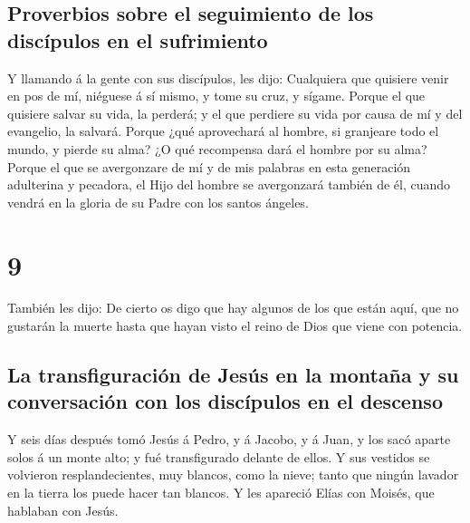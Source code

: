 \hypertarget{proverbios-sobre-el-seguimiento-de-los-discuxedpulos-en-el-sufrimiento}{%
\subsection{Proverbios sobre el seguimiento de los discípulos en el
sufrimiento}\label{proverbios-sobre-el-seguimiento-de-los-discuxedpulos-en-el-sufrimiento}}

 Y llamando á la gente con sus discípulos, les dijo:
Cualquiera que quisiere venir en pos de mí, niéguese á sí mismo, y tome
su cruz, y sígame.  Porque el que quisiere salvar su
vida, la perderá; y el que perdiere su vida por causa de mí y del
evangelio, la salvará.  Porque ¿qué aprovechará al
hombre, si granjeare todo el mundo, y pierde su alma?  ¿O
qué recompensa dará el hombre por su alma?  Porque el que
se avergonzare de mí y de mis palabras en esta generación adulterina y
pecadora, el Hijo del hombre se avergonzará también de él, cuando vendrá
en la gloria de su Padre con los santos ángeles.

\hypertarget{section-8}{%
\section{9}\label{section-8}}

 También les dijo: De cierto os digo que hay algunos de
los que están aquí, que no gustarán la muerte hasta que hayan visto el
reino de Dios que viene con potencia.

\hypertarget{la-transfiguraciuxf3n-de-jesuxfas-en-la-montauxf1a-y-su-conversaciuxf3n-con-los-discuxedpulos-en-el-descenso}{%
\subsection{La transfiguración de Jesús en la montaña y su conversación
con los discípulos en el
descenso}\label{la-transfiguraciuxf3n-de-jesuxfas-en-la-montauxf1a-y-su-conversaciuxf3n-con-los-discuxedpulos-en-el-descenso}}

 Y seis días después tomó Jesús á Pedro, y á Jacobo, y á
Juan, y los sacó aparte solos á un monte alto; y fué transfigurado
delante de ellos.  Y sus vestidos se volvieron
resplandecientes, muy blancos, como la nieve; tanto que ningún lavador
en la tierra los puede hacer tan blancos.  Y les apareció
Elías con Moisés, que hablaban con Jesús.


